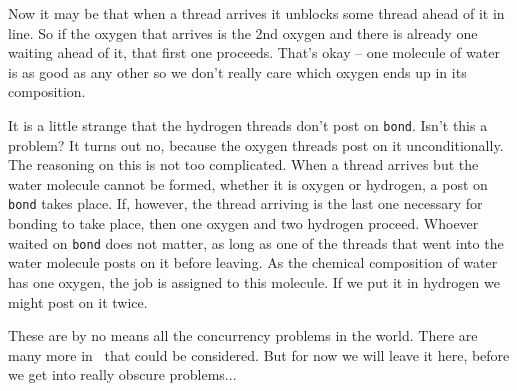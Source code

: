 Now it may be that when a thread arrives it unblocks some thread ahead of it in line. So if the oxygen that arrives is the 2nd oxygen and there is already one waiting ahead of it, that first one proceeds. That's okay -- one molecule of water is as good as any other so we don't really care which oxygen ends up in its composition.

It is a little strange that the hydrogen threads don't post on \texttt{bond}. Isn't this a problem? It turns out no, because the oxygen threads post on it unconditionally. The reasoning on this is not too complicated. When a thread arrives but the water molecule cannot be formed, whether it is oxygen or hydrogen, a post on \texttt{bond} takes place. If, however, the thread arriving is the last one necessary for bonding to take place, then one oxygen and two hydrogen proceed. Whoever waited on \texttt{bond} does not matter, as long as one of the threads that went into the water molecule posts on it before leaving. As the chemical composition of water has one oxygen, the job is assigned to this molecule. If we put it in hydrogen we might post on it twice.

These are by no means all the concurrency problems in the world. There are many more in~\cite{lbs} that could be considered. But for now we will leave it here, before  we get into really obscure problems...



